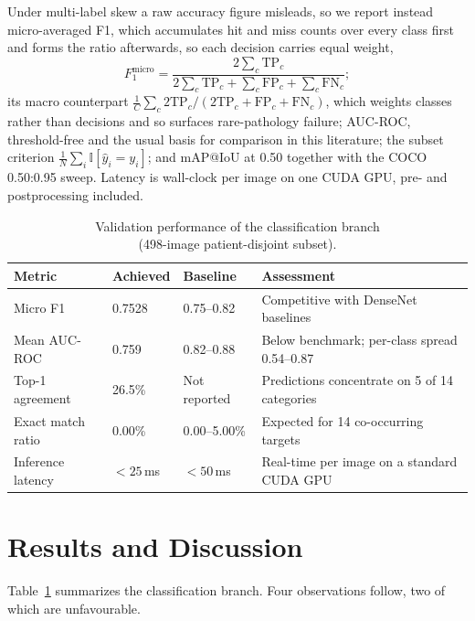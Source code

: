 \documentclass[conference]{IEEEtran}
\begin{document}
Under multi-label skew a raw accuracy figure misleads, so we report instead
micro-averaged F1, which accumulates hit and miss counts over every class first
and forms the ratio afterwards, so each decision carries equal weight,
\begin{equation}
F_1^{\mathrm{micro}} = \frac{2\sum_c \mathrm{TP}_c}
{2\sum_c \mathrm{TP}_c + \sum_c \mathrm{FP}_c + \sum_c \mathrm{FN}_c};
\end{equation}
its macro counterpart $\frac{1}{C}\sum_c 2\mathrm{TP}_c / (2\mathrm{TP}_c +
\mathrm{FP}_c + \mathrm{FN}_c)$, which weights classes rather than decisions and
so surfaces rare-pathology failure; AUC-ROC, threshold-free and the usual basis
for comparison in this literature; the subset criterion
$\frac{1}{N} \sum_i \mathbb{I}[\hat{y}_i = y_i]$; and mAP@IoU at 0.50 together
with the COCO 0.50:0.95 sweep. Latency is wall-clock per image on one CUDA GPU,
pre- and postprocessing included.

\begin{table}[!t]
\caption{Validation performance of the classification branch\\(498-image patient-disjoint subset).}
\label{tab:results}
\centering
\footnotesize
\begin{tabular}{@{}p{1.75cm}p{1.0cm}p{1.15cm}p{3.0cm}@{}}
\toprule
Metric & Achieved & Baseline & Assessment \\
\midrule
Micro F1 & 0.7528 & 0.75--0.82 & Competitive with DenseNet baselines \\
Mean AUC-ROC & 0.759 & 0.82--0.88 & Below benchmark; per-class spread 0.54--0.87 \\
Top-1 agreement & 26.5\% & Not reported & Predictions concentrate on 5 of 14 categories \\
Exact match ratio & 0.00\% & 0.00--5.00\% & Expected for 14 co-occurring targets \\
Inference latency & $<25$\,ms & $<50$\,ms & Real-time per image on a standard CUDA GPU \\
\bottomrule
\end{tabular}
\end{table}

\section{Results and Discussion}
\label{sec:results}

Table~\ref{tab:results} summarizes the classification branch. Four observations
follow, two of which are unfavourable.
\end{document}
